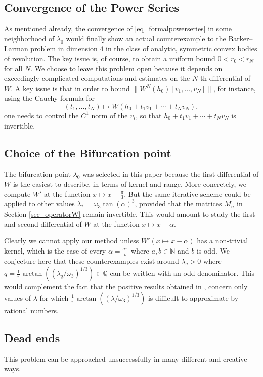 \documentclass{amsart}
\def \N{\mathbb N}
\begin{document}
\subsection{Convergence of the Power Series} As mentioned already, the convergence of \eqref{eq_formalpowerseries} in some neighborhood of $\lambda_0$ would finally show an actual counterexample to the Barker--Larman problem in dimension $4$ in the class of analytic, symmetric convex bodies of revolution.
		The key issue is, of course, to obtain a uniform bound $0 < r_0 < r_N$ for all $N$.
		We choose to leave this problem open because it depends on exceedingly complicated computations and estimates on the $N$-th differential of $W$.
		A key issue is that in order to bound $\|W^{N}(h_0)[v_1, \ldots, v_N]\|$, for instance, using the Cauchy formula for
		\[(t_1, \ldots, t_N) \mapsto W(h_0 + t_1 v_1 + \cdots + t_N v_N),\]
		one needs to control the $C^1$ norm of the $v_i$, so that $h_0 + t_1 v_1 + \cdots + t_N v_N$ is invertible.

		\subsection{Choice of the Bifurcation point} The bifurcation point $\lambda_0$ was selected in this paper because the first differential of $W$ is the easiest to describe, in terms of kernel and range.
		More concretely, we compute $W'$ at the function $x \mapsto x - \frac \pi 3$.
		But the same iterative scheme could be applied to other values $\lambda_* = \omega_3 \tan(\alpha)^3$, provided that the matrices $M_n$ in Section \ref{sec_operatorW} remain invertible.
		This would amount to study the first and second differential of $W$ at the function $x \mapsto x-\alpha$.

		Clearly we cannot apply our method unless $W'(x \mapsto x - \alpha)$ has a non-trivial kernel, which is the case of every $\alpha = \frac {a \pi}b$ where $a,b \in \N$ and $b$ is odd.
		We conjecture here that these counterexamples exist around $\lambda_q>0$ where $q = \frac 1\pi \arctan((\lambda_q/\omega_3)^{1/3}) \in \mathbb Q$ can be written with an odd denominator.
		This would complement the fact that the positive results obtained in \cite{haddad2026convex}, concern only values of $\lambda$ for which $\frac 1\pi \arctan((\lambda/\omega_3)^{1/3})$ is difficult to approximate by rational numbers.
		\subsection{Dead ends} This problem can be approached unsuccessfully in many different and creative ways.
\end{document}
